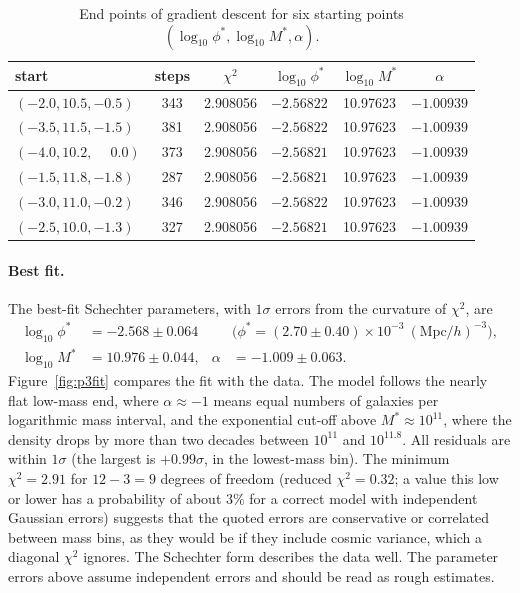 \documentclass[11pt]{article}
\begin{document}
\begin{table}[htbp]
\centering
\caption{End points of gradient descent for six starting points
$(\log_{10}\phi^*,\log_{10}M^*,\alpha)$.}
\label{tab:p3}
\begin{tabular}{lccccc}
\toprule
start & steps & $\chi^2$ & $\log_{10}\phi^*$ & $\log_{10}M^*$ & $\alpha$\\
\midrule
$(-2.0, 10.5, -0.5)$ & 343 & 2.908056 & $-2.56822$ & 10.97623 & $-1.00939$\\
$(-3.5, 11.5, -1.5)$ & 381 & 2.908056 & $-2.56822$ & 10.97623 & $-1.00939$\\
$(-4.0, 10.2, \phantom{-}0.0)$ & 373 & 2.908056 & $-2.56821$ & 10.97623 & $-1.00939$\\
$(-1.5, 11.8, -1.8)$ & 287 & 2.908056 & $-2.56821$ & 10.97623 & $-1.00939$\\
$(-3.0, 11.0, -0.2)$ & 346 & 2.908056 & $-2.56822$ & 10.97623 & $-1.00939$\\
$(-2.5, 10.0, -1.3)$ & 327 & 2.908056 & $-2.56821$ & 10.97623 & $-1.00939$\\
\bottomrule
\end{tabular}
\end{table}

\paragraph{Best fit.}
The best-fit Schechter parameters, with $1\sigma$ errors from the curvature of
$\chi^2$, are
\begin{align*}
\log_{10}\phi^* &= -2.568\pm0.064 &
&\big(\phi^* = (2.70\pm0.40)\times10^{-3}\ (\mathrm{Mpc}/h)^{-3}\big),\\
\log_{10}M^* &= 10.976\pm0.044, & \alpha &= -1.009\pm0.063 .
\end{align*}
Figure~\ref{fig:p3fit} compares the fit with the data. The model follows the
nearly flat low-mass end, where $\alpha\approx-1$ means equal numbers of galaxies
per logarithmic mass interval, and the exponential cut-off above
$M^*\approx10^{11}$, where the density drops by more than two decades between
$10^{11}$ and $10^{11.8}$. All residuals are within $1\sigma$ (the largest is $+0.99\sigma$, in the
lowest-mass bin). The minimum $\chi^2 = 2.91$ for $12-3 = 9$ degrees of freedom
(reduced $\chi^2 = 0.32$; a value this low or lower has a probability of about
3\% for a correct model with independent Gaussian errors) suggests that the
quoted errors are conservative or correlated between mass bins, as they would
be if they include cosmic variance, which a diagonal $\chi^2$ ignores. The
Schechter form describes the data well. The parameter errors above assume
independent errors and should be read as rough estimates.
\end{document}
